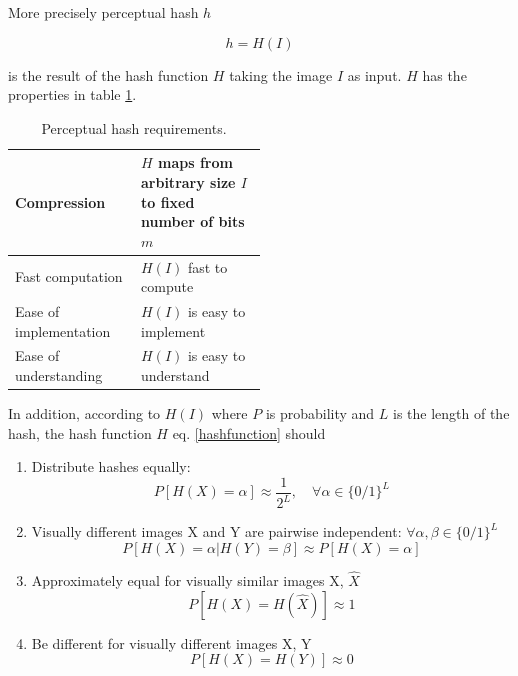 \documentclass[english,12pt,a4paper,pdftex,elec,utf8]{aaltothesis}
\begin{document}
More precisely perceptual hash $h$

\begin{equation}\label{hashfunction}
h = H(I)
\end{equation}

is the result of the hash function $H$ taking the image $I$ as input. $H$ has the properties in table \ref{hashcriteria}.

\def\arraystretch{1.5}
\begin{table}[htb]
\caption{Perceptual hash requirements. \cite{Zauner2010}}
\label{hashcriteria}
\begin{center}
\begin{tabular}{lp{0.5\linewidth}}
  \hline \hline
  Compression & $H$ maps from arbitrary size $I$ to fixed number of bits $m$\\
  \hline
  Fast computation & $H(I)$ fast to compute \\
  \hline
  Ease of implementation & $H(I)$ is easy to implement\\
  \hline
  Ease of understanding & $H(I)$ is easy to understand\\
  \hline
\end{tabular}
\end{center}\end{table}


In addition, according to \cite{mihccak2001new} $H(I)$ where $P$ is probability and $L$ is the length of the hash, the hash function $H$ eq. \ref{hashfunction} should
\begin{enumerate}
\item Distribute hashes equally:\\
  \begin{equation}\label{phashdistribute}
  P[H(X)=\alpha]\approx\frac{1}{2^L},\quad\forall\alpha\in \{0/1\}^L
  \end{equation}
\item Visually different images X and Y are pairwise independent: $\forall\alpha,\beta\in\{0/1\}^L$\\
  \begin{equation}\label{phashindependent}
    P[H(X)=\alpha|H(Y)=\beta]\approx P[H(X)=\alpha]
  \end{equation}
\item Approximately equal for visually similar images X, $\hat{X}$\\
  \begin{equation}\label{phashsame}
    P[H(X) = H(\hat{X})] \approx 1
  \end{equation}

\item Be different for visually different images X, Y\\
  \begin{equation}\label{phashdif}
    P[H(X)=H(Y)]\approx 0
  \end{equation}
\end{enumerate}
\end{document}
